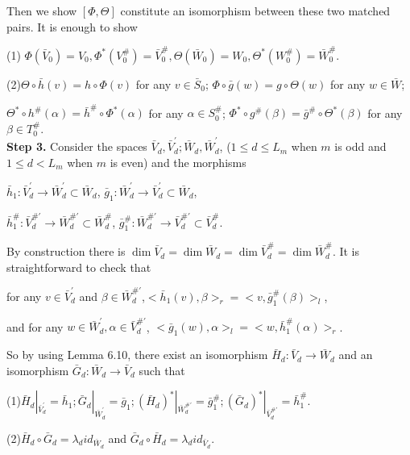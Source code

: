 \def\CTEXPreproc{Created by ctex v0.2.12, don't edit!}\documentclass[11pt]{article}
\begin{document}
\begin{pf}
 Then  we show $[ \Phi ,\Theta ]$ constitute an isomorphism between these two matched pairs. It is enough to show

        (1) $\Phi(\bar{V}_0)= V_0 , \Phi^{*}( V^{\#}_0  )=\bar{V}^{\#}_0 , \Theta(\bar{W}_0 ) = W_0 ,\Theta^{*}( W^{\#}_0 )=\bar{W}^{\#}_0 .$

        (2)$\Theta \circ \bar{h}(v )= h\circ \Phi (v) $ for any $v\in \bar{S}_0 $;
         $\Phi \circ \bar{g}(w)=g\circ \Theta(w)$ for any $w\in \bar{W}$;

         $\Theta^{*} \circ h^{\#}(\alpha )= \bar{h}^{\#}\circ \Phi^{*} (\alpha) $ for any $\alpha\in S^{\#} _0 $;
         $\Phi^{*} \circ g^{\#}(\beta)=\bar{g}^{\#} \circ \Theta^{*}(\beta)$ for any $\beta\in T^{\#}_0 $.\\


 \noindent \textbf{Step 3.} Consider the spaces $\bar{V}_d  ,  \bar{V}^{'}_d ;\bar{W}_d  ,  \bar{W}^{'}_d  $,  ($1\leq d\leq L_m $ when $m$ is odd and
 $1\leq d<L_m $ when $m$ is even)  and the morphisms

       $\bar{h}_1 :\bar{V}^{'}_d \rightarrow \bar{W}^{'} _d \subset \bar{W}_d $, $\bar{g}_1 :\bar{W}^{'}_d \rightarrow \bar{V}^{'} _d \subset \bar{W}_d   $,

       $\bar{h}^{\#}_1 :\bar{V}^{\# '}_d \rightarrow \bar{W}^{\# '} _d \subset \bar{W}^{\#}_d $, $\bar{g}^{\#}_1 :\bar{W}^{\# '}_d \rightarrow \bar{V}^{\# '} _d \subset \bar{V}^{\#}_d   $.

       By construction  there is $\dim \bar{V}_d = \dim \bar{W}_d = \dim \bar{V}^{\#}_d = \dim \bar{W}^{\#}_d$.  It is straightforward to check that

       for any $v\in \bar{V}^{'}_d$ and $\beta \in \bar{W}^{\# '}_d    $,$< \bar{h}_1 (v) ,\beta   >_r =< v , \bar{g}^{\#}_1 (\beta)    >_l $,

       and for any $w\in \bar{W}^{'}_d ,  \alpha\in \bar{V}^{\# '}_d $, $< \bar{g}_1 (w) ,\alpha  >_l =< w, \bar{h}^{\#}_1 (\alpha)  >_r $.

       So by using Lemma 6.10, there exist an isomorphism $\bar{H}_d : \bar{V}_d \rightarrow \bar{W}_d $ and an isomorphism $\bar{G}_d : \bar{W}_d \rightarrow \bar{V}_d $ such that

       (1)$\bar{H}_d |_{\bar{V}^{'}_d  }= \bar{h}_1 ; \bar{G}_d |_{\bar{W}^{'}_d }=\bar{g}_1 ;(\bar{H}_d )^* |_{\bar{W}^{\# '}_d  }= \bar{g}^{\#}_1 ; (\bar{G}_d)^* |_{\bar{V}^{\# '}_d }=\bar{h}^{\# }_1   $.

       (2)$\bar{H}_d \circ \bar{G}_d = \lambda_d id_{\bar{W}_d }$ and $ \bar{G}_d \circ \bar{H}_d =\lambda_d id_{\bar{V}_d }  $.


\end{pf}
\end{document}
